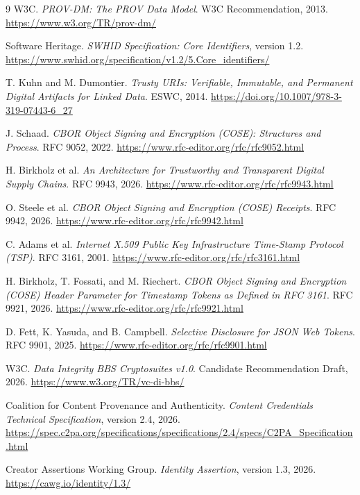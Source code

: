 \documentclass[acmsmall,screen,review,nonacm]{acmart}
\begin{document}
\ifdefined\ACSDACSAC
  \clearpage
\fi
\begin{thebibliography}{9}
W3C. \emph{PROV-DM: The PROV Data Model}. W3C Recommendation, 2013. \url{https://www.w3.org/TR/prov-dm/}

Software Heritage. \emph{SWHID Specification: Core Identifiers}, version 1.2. \url{https://www.swhid.org/specification/v1.2/5.Core_identifiers/}

T. Kuhn and M. Dumontier. \emph{Trusty URIs: Verifiable, Immutable, and Permanent Digital Artifacts for Linked Data}. ESWC, 2014. \url{https://doi.org/10.1007/978-3-319-07443-6_27}

J. Schaad. \emph{CBOR Object Signing and Encryption (COSE): Structures and Process}. RFC 9052, 2022. \url{https://www.rfc-editor.org/rfc/rfc9052.html}

H. Birkholz et al. \emph{An Architecture for Trustworthy and Transparent Digital Supply Chains}. RFC 9943, 2026. \url{https://www.rfc-editor.org/rfc/rfc9943.html}

O. Steele et al. \emph{CBOR Object Signing and Encryption (COSE) Receipts}. RFC 9942,
2026. \url{https://www.rfc-editor.org/rfc/rfc9942.html}

C. Adams et al. \emph{Internet X.509 Public Key Infrastructure Time-Stamp Protocol (TSP)}. RFC 3161, 2001. \url{https://www.rfc-editor.org/rfc/rfc3161.html}

H. Birkholz, T. Fossati, and M. Riechert. \emph{CBOR Object Signing and
Encryption (COSE) Header Parameter for Timestamp Tokens as Defined in RFC
3161}. RFC 9921, 2026. \url{https://www.rfc-editor.org/rfc/rfc9921.html}

D. Fett, K. Yasuda, and B. Campbell. \emph{Selective Disclosure for JSON Web Tokens}. RFC 9901, 2025. \url{https://www.rfc-editor.org/rfc/rfc9901.html}

W3C. \emph{Data Integrity BBS Cryptosuites v1.0}. Candidate Recommendation Draft, 2026. \url{https://www.w3.org/TR/vc-di-bbs/}

Coalition for Content Provenance and Authenticity. \emph{Content Credentials
Technical Specification}, version 2.4, 2026.
\url{https://spec.c2pa.org/specifications/specifications/2.4/specs/C2PA_Specification.html}

Creator Assertions Working Group. \emph{Identity Assertion}, version 1.3,
2026. \url{https://cawg.io/identity/1.3/}


\end{thebibliography}
\end{document}
